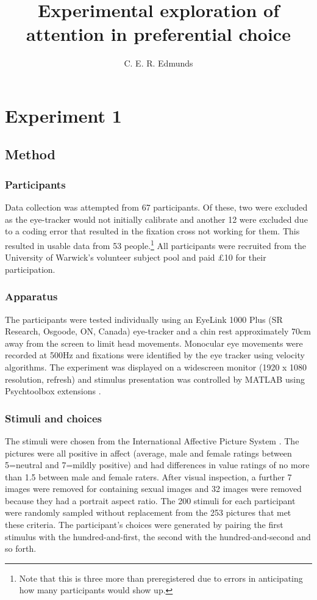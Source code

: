 \documentclass[doc, a4paper, apacite]{apa6}
\title{Experimental exploration of attention in preferential choice}
\author{C. E. R. Edmunds}
\affiliation{University of Warwick}
\begin{document}
\maketitle

\section{Experiment 1} \label{exp:NS01} 
\subsection{Method}
\subsubsection{Participants}
Data collection was attempted from 67 participants. Of these, two were excluded as the eye-tracker would not initially calibrate and another 12 were excluded due to a coding error that resulted in the fixation cross not working for them. This resulted in usable data from 53 people.\footnote{Note that this is three more than preregistered due to errors in anticipating how many participants would show up.} All participants were recruited from the University of Warwick's volunteer subject pool and paid \pounds10 for their participation.

\subsubsection{Apparatus}
The participants were tested individually using an EyeLink 1000 Plus (SR Research, Osgoode, ON, Canada) eye-tracker and a chin rest approximately 70cm away from the screen to limit head movements. Monocular eye movements were recorded at 500Hz and fixations were identified by the eye tracker using velocity algorithms. The experiment was displayed on a widescreen monitor (1920 x 1080 resolution, refresh) and stimulus presentation was controlled by MATLAB using Psychtoolbox extensions \cite{Brainard1997, Pelli1997}.

\subsubsection{Stimuli and choices}
The stimuli were chosen from the International Affective Picture System \cite{Lang:2008}. The pictures were all positive in affect (average, male and female ratings between 5=neutral and 7=mildly positive) and had differences in value ratings of no more than 1.5 between male and female raters. After visual inspection, a further 7 images were removed for containing sexual images and 32 images were removed because they had a portrait aspect ratio. The 200 stimuli for each participant were randomly sampled without replacement from the 253 pictures that met these criteria. The participant's choices were generated by pairing the first stimulus with the hundred-and-first, the second with the hundred-and-second and so forth. 
\end{document}
